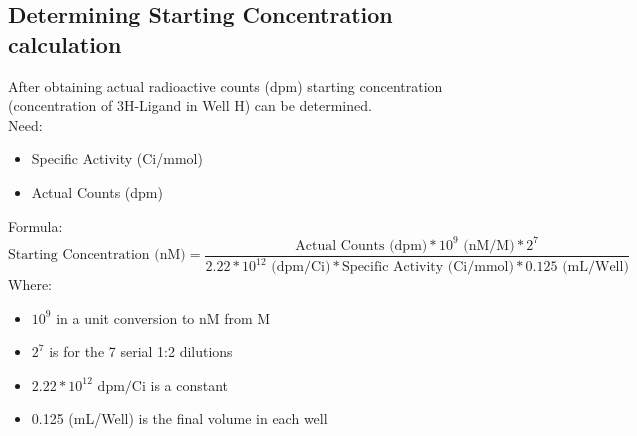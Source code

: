 \documentclass[12pt, letterpaper]{article}
\begin{document}
\subsection{Determining Starting Concentration calculation}
After obtaining actual radioactive counts (dpm) starting concentration (concentration of 3H-Ligand in Well H) can be determined.
\\Need:
\begin{itemize}
    \item Specific Activity (Ci/mmol)
    \item Actual Counts (dpm)
\end{itemize}
Formula:
\[\text{Starting Concentration (nM)} = \frac{\text{Actual Counts (dpm)} * 10^9 \text{ (nM/M)} * 2^7}{2.22*10^{12} \text{ (dpm/Ci)} * \text{Specific Activity (Ci/mmol)} * 0.125 \text{ (mL/Well)}}\]
Where:
\begin{itemize}
    \item $10^9$ in a unit conversion to nM from M
    \item $2^7$ is for the 7 serial 1:2 dilutions
    \item $2.22*10^{12} \text{ dpm/Ci}$ is a constant
    \item 0.125 (mL/Well) is the final volume in each well
\end{itemize}
\end{document}
